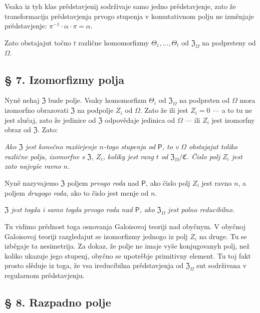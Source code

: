 \documentclass[11pt]{article}
\begin{document}
Vsaka iz tyh klas prědstavjenij sodrživaje samo jedno prědstavjenje, zato že transformacija prědstavjenja prvogo stupenja v komutativnom polju ne izměnjaje prědstavjenje: \(\pi^{-1}\cdot\alpha\cdot\pi=\alpha\).

Zato obstajajut točno \(t\) različne homomorfizmy \(\Theta_1,\ldots,\Theta_t\) od \(\mathfrak Z_\Omega\) na podprsteny od \(\Omega\).

\subsection*{§ 7. Izomorfizmy polja}\label{die-isomorphismen-eines-koerpers}

Nyně nehaj \(\mathfrak Z\) bude polje. Vsaky homomorfizm \(\Theta_i\) od \(\mathfrak Z_\Omega\) na podprsten od \(\Omega\) mora izomorfno obrazovati \(\mathfrak Z\) na podpolje \(Z_i\) od \(\Omega\). Zato že ili jest \(Z_i=0\) --- a to tu ne jest slučaj, zato že jedinice od \(\mathfrak Z\) odpovědaje jedinica od \(\Omega\) --- ili \(Z_i\) jest izomorfny obraz od \(\mathfrak Z\). Zato:

\emph{Ako \(\mathfrak Z\) jest konečno razširjenje \(n\)-togo stupenja od \(\mathsf P\), to v \(\Omega\) obstajajut toliko različne polja, izomorfne s \(\mathfrak Z\), \(Z_i\), koliky jest rang \(t\) od \(\mathfrak Z_\Omega/\mathfrak C\). Čislo polj \(Z_i\) jest zato najvyše ravno \(n\).}

Nyně nazyvajemo \(\mathfrak Z\) poljem \emph{prvogo roda} nad \(\mathsf P\), ako čislo polj \(Z_i\) jest ravno \(n\), a poljem \emph{drugogo roda}, ako to čislo jest menje od \(n\).

\emph{\(\mathfrak Z\) jest togda i samo togda prvogo roda nad \(\mathsf P\), ako \(\mathfrak Z_\Omega\) jest polno reducibilno.}

Tu vidimo prědnost toga osnovanja Galoisovoj teoriji nad obyčnym. V obyčnoj Galoisovoj teoriji razgledajut se izomorfizmy jednogo iz polj \(Z_i\) na druge. Tu se izběgaje ta nesimetrija. Za dokaz, že polje ne imaje vyše konjugovanyh polj, než koliko ukazuje jego stupenj, obyčno se upotrěbje primitivny element. Tu toj fakt prosto slěduje iz toga, že vsa ireducibilna prědstavjenja od \(\mathfrak Z_\Omega\) sut sodrživana v regularnom prědstavjenju.

\subsection*{§ 8. Razpadno polje}\label{der-zerfaellungskoerper}
\end{document}
